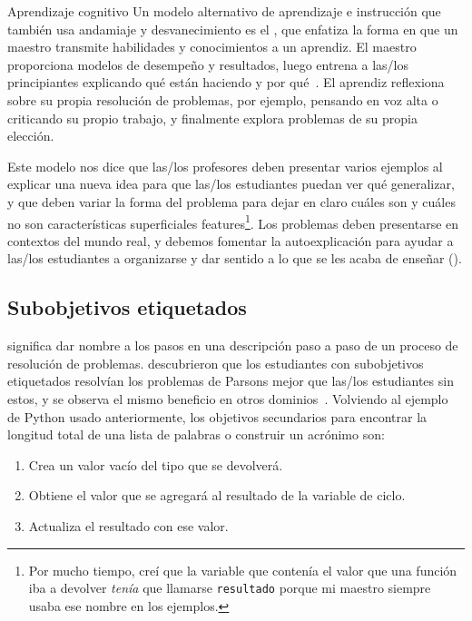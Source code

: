\begin{aside}{Aprendizaje cognitivo}
  Un modelo alternativo de aprendizaje e instrucción que también usa andamiaje y desvanecimiento
  es el ,
  que enfatiza la forma en que un maestro transmite habilidades y conocimientos a un aprendiz.
  El maestro proporciona modelos de desempeño y resultados,
  luego entrena a las/los principiantes explicando qué están haciendo y por qué~\cite{Coll1991,Casp2007}.
  El aprendiz reflexiona sobre su propia resolución de problemas,
  por ejemplo, pensando en voz alta o criticando su propio trabajo,
  y finalmente explora problemas de su propia elección.

  Este modelo nos dice que
  las/los profesores deben presentar varios ejemplos al explicar una nueva idea
  para que las/los estudiantes puedan ver qué generalizar,
  y que deben variar la forma del problema para dejar en claro
  cuáles son y cuáles no son características superficiales features\footnote{Por mucho tiempo,
     creí que la variable que contenía el valor que una función iba a devolver
     \emph{tenía} que llamarse \texttt{resultado}
     porque mi maestro siempre usaba ese nombre en los ejemplos.}.    
  Los problemas deben presentarse en contextos del mundo real,
  y debemos fomentar la autoexplicación para ayudar a las/los estudiantes
  a organizarse y dar sentido a lo que se les acaba de enseñar
 ().
\end{aside}


\subsection*{Subobjetivos etiquetados}
 
 significa
dar nombre a los pasos en una descripción paso a paso de un proceso de resolución de problemas.
\cite{Marg2016,Morr2016} descubrieron que los estudiantes con subobjetivos etiquetados
resolvían los problemas de Parsons mejor que las/los estudiantes sin estos,
y se observa el mismo beneficio en otros dominios~\cite{Marg2012}.
Volviendo al ejemplo de Python usado anteriormente,
los objetivos secundarios para encontrar la longitud total de una lista de palabras o construir un acrónimo son:

\begin{enumerate}

\item
  Crea un valor vacío del tipo que se devolverá.

\item
  Obtiene el valor que se agregará al resultado de la variable de ciclo.

\item
  Actualiza el resultado con ese valor.

\end{enumerate}

